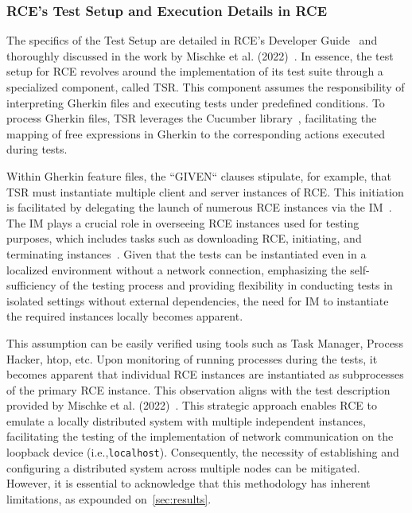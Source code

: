 \subsubsection{\ac{RCE}'s Test Setup and Execution Details in RCE}
The specifics of the Test Setup are detailed in \ac{RCE}'s Developer Guide~\cite{rceDevGuide10x} and thoroughly discussed in the work by Mischke et al. (2022)~\cite{10.1007/978-3-031-08760-8_44}. In essence, the test setup for \ac{RCE} revolves around the implementation of its test suite through a specialized component, called \acf{TSR}. This component assumes the responsibility of interpreting Gherkin files and executing tests under predefined conditions. To process Gherkin files, \ac{TSR} leverages the Cucumber library~\cite{10.1007/978-3-031-08760-8_44}, facilitating the mapping of free expressions in Gherkin to the corresponding actions executed during tests.

Within Gherkin feature files, the ``GIVEN`` clauses stipulate, for example, that \ac{TSR} must instantiate multiple client and server instances of \ac{RCE}. This initiation is facilitated by delegating the launch of numerous \ac{RCE} instances via the \acf{IM}~\cite{rceDevGuide10x}. 
The \ac{IM} plays a crucial role in overseeing \ac{RCE} instances used for testing purposes, which includes tasks such as downloading \ac{RCE}, initiating, and terminating instances~\cite{10.1007/978-3-031-08760-8_44,rceDevGuide10x}. Given that the tests can be instantiated even in a localized environment without a network connection, emphasizing the self-sufficiency of the testing process and providing flexibility in conducting tests in isolated settings without external dependencies, the need for \ac{IM} to instantiate the required instances locally becomes apparent.

This assumption can be easily verified using tools such as Task Manager, Process Hacker, htop, etc. Upon monitoring of running processes during the tests, it becomes apparent that individual \ac{RCE} instances are instantiated as subprocesses of the primary \ac{RCE} instance. This observation aligns with the test description provided by Mischke et al. (2022)~\cite{10.1007/978-3-031-08760-8_44}. This strategic approach enables \ac{RCE} to emulate a locally distributed system with multiple independent instances, facilitating the testing of the implementation of network communication on the loopback device (i.e.,\texttt{localhost}). Consequently, the necessity of establishing and configuring a distributed system across multiple nodes can be mitigated. However, it is essential to acknowledge that this methodology has inherent limitations, as expounded on~\cref{sec:results}.


